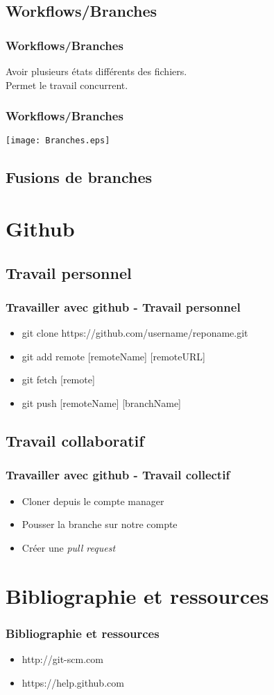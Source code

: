 \documentclass{beamer}
\begin{document}
\subsection{Workflows/Branches}
\begin{frame}
	\frametitle{Workflows/Branches}
	Avoir plusieurs \'etats diff\'erents des fichiers.\\
	Permet le travail concurrent.
\end{frame}
\begin{frame}
	\frametitle{Workflows/Branches}
	\begin{center}
		\texttt{[image: Branches.eps]}
	\end{center}
\end{frame}

\subsection{Fusions de branches}

\section{Github}
\subsection{Travail personnel}
\begin{frame}
	\frametitle{Travailler avec github - Travail personnel}
	\begin{itemize}
		\item{git clone https://github.com/username/reponame.git}
		\item{git add remote [remoteName] [remoteURL]}
		\item{git fetch [remote]}
		\item{git push [remoteName] [branchName]}
	\end{itemize}
\end{frame}

\subsection{Travail collaboratif}
\begin{frame}
	\frametitle{Travailler avec github - Travail collectif}
	\begin{itemize}
		\item{Cloner depuis le compte manager}
		\item{Pousser la branche sur notre compte}
		\item{Cr\'eer une \emph{pull request}}
	\end{itemize}
\end{frame}

\section{Bibliographie et ressources}
\begin{frame}
	\frametitle{Bibliographie et ressources}
	\begin{itemize}
		\item{http://git-scm.com}
		\item{https://help.github.com}
	\end{itemize}
\end{frame}
\end{document}
